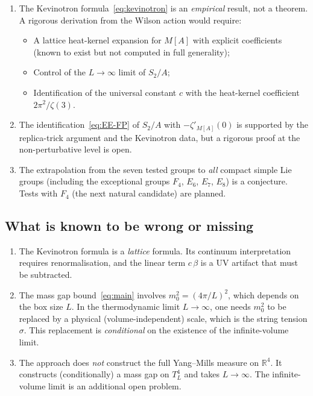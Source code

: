 \documentclass[11pt,a4paper]{amsart}
\theoremstyle{definition}
\theoremstyle{remark}
\newcommand{\R}{\mathbb{R}}
\begin{document}
\begin{enumerate}[leftmargin=2.5em]
\item The Kevinotron formula~\eqref{eq:kevinotron} is an \emph{empirical}
      result, not a theorem. A rigorous derivation from the Wilson action
      would require:
      \begin{itemize}[leftmargin=1.5em]
      \item A lattice heat-kernel expansion for $M[A]$ with explicit
            coefficients (known to exist but not computed in full
            generality);
      \item Control of the $L \to \infty$ limit of $S_2/A$;
      \item Identification of the universal constant $c$ with the
            heat-kernel coefficient $2\pi^2/\zeta(3)$.
      \end{itemize}

\item The identification~\eqref{eq:EE-FP} of $S_2/A$ with $-\zeta'_{M[A]}(0)$
      is supported by the replica-trick argument and the Kevinotron data,
      but a rigorous proof at the non-perturbative level is open.

\item The extrapolation from the seven tested groups to \emph{all} compact
      simple Lie groups (including the exceptional groups $F_4$, $E_6$,
      $E_7$, $E_8$) is a conjecture. Tests with $F_4$ (the next natural
      candidate) are planned.
\end{enumerate}

\subsection{What is known to be wrong or missing}

\begin{enumerate}[leftmargin=2.5em]
\item The Kevinotron formula is a \emph{lattice} formula. Its continuum
      interpretation requires renormalisation, and the linear term
      $c\,\beta$ is a UV artifact that must be subtracted.

\item The mass gap bound~\eqref{eq:main} involves $m_0^2 = (4\pi/L)^2$,
      which depends on the box size $L$. In the thermodynamic limit
      $L \to \infty$, one needs $m_0^2$ to be replaced by a physical
      (volume-independent) scale, which is the string tension $\sigma$.
      This replacement is \emph{conditional} on the existence of the
      infinite-volume limit.

\item The approach does \emph{not} construct the full Yang--Mills measure
      on $\R^4$. It constructs (conditionally) a mass gap on $T^4_L$ and
      takes $L \to \infty$. The infinite-volume limit is an additional
      open problem.
\end{enumerate}
\end{document}

